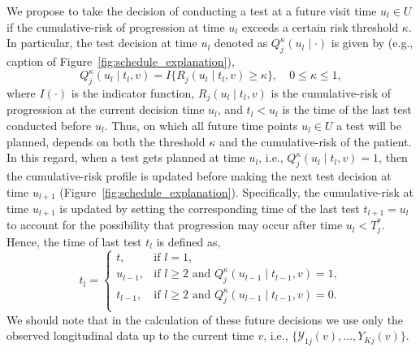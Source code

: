 We propose to take the decision of conducting a test at a future visit time $u_l \in U$ if the cumulative-risk of progression at time $u_l$ exceeds a certain risk threshold $\kappa$. In particular, the test decision at time $u_l$ denoted as $Q^\kappa_j (u_l \mid \cdot)$ is given by (e.g., caption of Figure~\ref{fig:schedule_explanation}),
\begin{equation}
\label{eq:personalized_decision_grid}
Q_j^\kappa (u_l \mid t_l, v) = I \big \{ R_j(u_l \mid t_l, v) \geq \kappa \big\}, \quad 0 \leq \kappa \leq 1,
\end{equation}
where $I(\cdot)$ is the indicator function, $R_j(u_l \mid t_l, v)$ is the cumulative-risk of progression at the current decision time $u_l$, and $t_l < u_l$ is the time of the last test conducted before $u_l$. Thus, on which all future time points $u_l \in U$ a test will be planned, depends on both the threshold $\kappa$ and the cumulative-risk of the patient. In this regard, when a test gets planned at time $u_l$, i.e., $Q_j^\kappa (u_l \mid t_l, v) = 1$, then the cumulative-risk profile is updated before making the next test decision at time $u_{l+1}$ (Figure~\ref{fig:schedule_explanation}). Specifically, the cumulative-risk at time $u_{l+1}$ is updated by setting the corresponding time of the last test $t_{l+1}=u_l$ to account for the possibility that progression may occur after time $u_l < T^*_j$. Hence, the time of last test $t_l$ is defined as,
\begin{equation*}
t_l = \left \{ 
\begin{array}{ll}
t, & \mbox{if } l = 1,\\
u_{l-1}, & \mbox{if } l \geq 2 \mbox{ and } Q_j^\kappa (u_{l-1} \mid t_{l-1}, v) = 1,\\
t_{l-1}, & \mbox{if } l \geq 2 \mbox{ and } Q_j^\kappa (u_{l-1} \mid t_{l-1}, v) = 0.\\
\end{array}
\right.
\end{equation*}
We should note that in the calculation of these future decisions we use only the observed longitudinal data up to the current time $v$, i.e., $\{\mathcal Y_{1j}(v), \ldots, Y_{Kj}(v)\}$.
